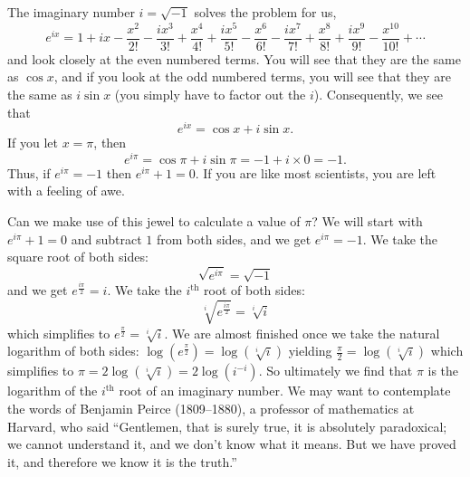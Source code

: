The imaginary number $i = \sqrt{-1}$ solves the problem for us,
$$
e^{i x} = 1+i x-\frac{x^2}{2!}-\frac{i x^3}{3!}+\frac{x^4}{4!}+\frac{i
x^5}{5!}-\frac{x^6}{6!}-\frac{i x^7}{7!}+\frac{x^8}{8!}+\frac{i
x^9}{9!}-\frac{x^{10}}{10!}+\cdots
$$
and look closely at the even numbered terms. You will see that they are
the same as $\cos x$, and if you look at the odd numbered terms, you
will see that they are the same as $i \sin x$ (you simply have to factor
out the $i$). Consequently, we see that
$$
e^{i x} = \cos x + i \sin x.
$$
If you let $x = \pi$, then
$$
e^{i \pi} = \cos \pi + i \sin \pi = -1 + i \times 0 = -1.
$$
Thus, if $e^{i \pi} = -1$ then $e^{i \pi} + 1 = 0$. If you are like most
scientists, you are left with a feeling of awe.

Can we make use of this jewel to calculate a value of $\pi$? We will
start with
        $e^{i \pi} + 1  = 0$ and subtract $1$ from both sides, and we get
        $e^{i \pi}  = -1$.
        We take the square root of both sides:
        $$\sqrt{e^{i \pi}}  = \sqrt{-1}$$ and we get
        $e^\frac{i \pi}{2}  = i$.
        We take the $i^\text{th}$ root of both sides:
        $$\sqrt[i]{e^\frac{i \pi}{2}} = \sqrt[i]{i}$$ which simplifies to
        $e^\frac{\pi}{2} = \sqrt[i]{i}$.
        We are almost finished once we take the natural logarithm of both sides:
        $\log(e^\frac{\pi}{2}) = \log(\sqrt[i]{i})$ yielding
        $\frac{\pi}{2} = \log(\sqrt[i]{i})$ which simplifies to
        $\pi = 2 \log(\sqrt[i]{i})= 2\log(i^{-i})$.
So ultimately we find that $\pi$ is the logarithm of the $i^{\text{th}}$
root of an imaginary number. We may want to contemplate the words of
Benjamin Peirce (1809--1880), a professor of mathematics at Harvard, who
said ``Gentlemen, that is surely true, it is absolutely paradoxical; we
cannot understand it, and we don’t know what it means. But we have
proved it, and therefore we know it is the truth.''

